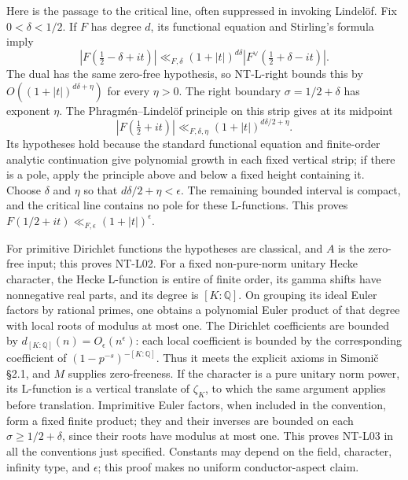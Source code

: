 Here is the passage to the critical line, often suppressed in invoking
Lindel\"of.  Fix $0<\delta<1/2$.  If $F$ has degree $d$, its functional
equation and Stirling's formula imply
\[
 |F(\tfrac12-\delta+it)|
 \ll_{F,\delta}(1+|t|)^{d\delta}
       |F^\vee(\tfrac12+\delta-it)|.
\]
The dual has the same zero-free hypothesis, so NT-L-right bounds this by
$O((1+|t|)^{d\delta+\eta})$ for every $\eta>0$.  The right boundary
$\sigma=1/2+\delta$ has exponent $\eta$.
The Phragm\'en--Lindel\"of principle on this strip gives at its midpoint
\[
 |F(\tfrac12+it)|\ll_{F,\delta,\eta}
                       (1+|t|)^{d\delta/2+\eta}.
\]
Its hypotheses hold because the standard functional equation and
finite-order analytic continuation give polynomial growth in each fixed
vertical strip; if there is a pole, apply the principle above and below
a fixed height containing it.  Choose $\delta$ and $\eta$ so that
$d\delta/2+\eta<\epsilon$.  The remaining bounded interval is compact,
and the critical line contains no pole for these L-functions.  This
proves $F(1/2+it)\ll_{F,\epsilon}(1+|t|)^\epsilon$.

For primitive Dirichlet functions the hypotheses are classical, and $A$
is the zero-free input; this proves NT-L02.  For a fixed non-pure-norm
unitary Hecke character, the Hecke L-function is entire of finite order,
its gamma shifts have nonnegative real parts, and its degree is
$[K:\mathbb Q]$.  On grouping its ideal Euler factors by rational primes,
one obtains a polynomial Euler product of that degree with local roots
of modulus at most one.  The Dirichlet coefficients are bounded by
$d_{[K:\mathbb Q]}(n)=O_\epsilon(n^\epsilon)$: each local coefficient
is bounded by the corresponding coefficient of $(1-p^{-s})^{-[K:\mathbb Q]}$.
Thus it meets the explicit axioms in Simoni\v c \S2.1, and $M$ supplies
zero-freeness.  If the character is a pure unitary norm power, its
L-function is a vertical translate of $\zeta_K$, to which the same
argument applies before translation.  Imprimitive Euler factors, when
included in the convention, form a fixed finite product; they and their
inverses are bounded on each $\sigma\ge1/2+\delta$, since their roots
have modulus at most one.  This proves NT-L03 in all the conventions just
specified.  Constants may depend on the field, character, infinity type,
and $\epsilon$; this proof makes no uniform conductor-aspect claim.


